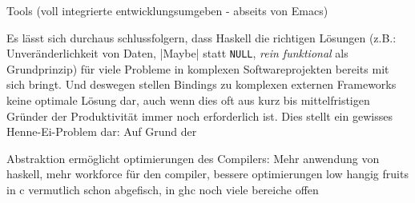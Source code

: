 Tools (voll integrierte entwicklungsumgeben - abseits von Emacs)


Es lässt sich durchaus schlussfolgern, dass Haskell die richtigen Lösungen (z.B.: Unveränderlichkeit von Daten, |Maybe| statt \texttt{NULL}, \textit{rein funktional} als Grundprinzip) für viele Probleme in komplexen Softwareprojekten bereits mit sich bringt. Und deswegen stellen Bindings zu komplexen externen Frameworks keine optimale Lösung dar, auch wenn dies oft aus kurz bis mittelfristigen Gründer der Produktivität immer noch erforderlich ist. Dies stellt ein gewisses Henne-Ei-Problem dar: Auf Grund der 

Abstraktion ermöglicht optimierungen des Compilers:
Mehr anwendung von haskell, mehr workforce für den compiler, bessere optimierungen
low hangig fruits in c vermutlich schon abgefisch, in ghc noch viele bereiche offen
